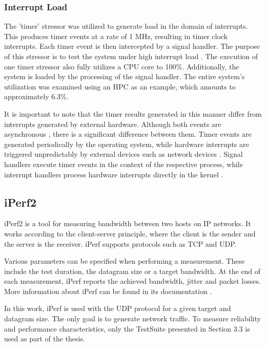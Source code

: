 \subsubsection{Interrupt Load} \label{chap:stressngInterrupt}
The 'timer' stressor was utilized to generate load in the domain of interrupts. This produces timer events at a rate of 1 MHz, resulting in timer clock interrupts. Each timer event is then intercepted by a signal handler. The purpose of this stressor is to test the system under high interrupt load \cite{stress02}. The execution of one timer stressor also fully utilizes a CPU core to 100\%. Additionally, the system is loaded by the processing of the signal handler. The entire system's utilization was examined using an HPC as an example, which amounts to approximately 6.3\%.

It is important to note that the timer results generated in this manner differ from interrupts generated by external hardware. Although both events are asynchronous \cite{like02}, there is a significant difference between them. Timer events are generated periodically by the operating system, while hardware interrupts are triggered unpredictably by external devices such as network devices \cite{stress14}. Signal handlers execute timer events in the context of the respective process, while interrupt handlers process hardware interrupts directly in the kernel \cite{like02}.




\subsection{iPerf2}
iPerf2 is a tool for measuring bandwidth between two hosts on IP networks. It works according to the client-server principle, where the client is the sender and the server is the receiver. iPerf supports protocols such as TCP and UDP.

Various parameters can be specified when performing a measurement. These include the test duration, the datagram size or a target bandwidth. At the end of each measurement, iPerf reports the achieved bandwidth, jitter and packet losses. More information about iPerf can be found in its documentation \cite{testsuite01}.

In this work, iPerf is used with the UDP protocol for a given target and datagram size. The only goal is to generate network traffic. To measure reliability and performance characteristics, only the TestSuite presented in Section 3.3 is used as part of the thesis.